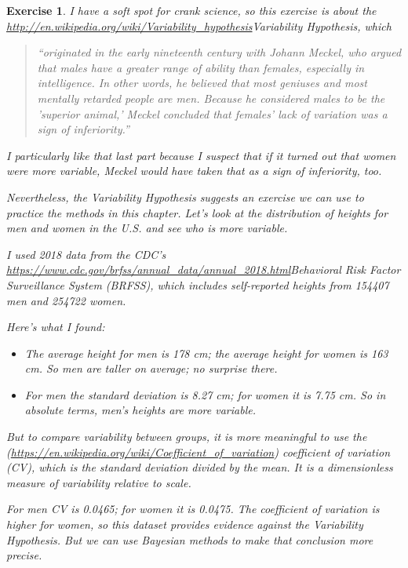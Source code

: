 \documentclass[12pt]{book}
\theoremstyle{exercise}
\newtheorem{exercise}{Exercise}[chapter]
\begin{document}
\begin{exercise}
I have a soft spot for crank science, so this
exercise is about the
\url{http://en.wikipedia.org/wiki/Variability_hypothesis}{Variability
Hypothesis}, which

\begin{quote}
``originated in the early nineteenth century with Johann Meckel, who
argued that males have a greater range of ability than females,
especially in intelligence. In other words, he believed that most
geniuses and most mentally retarded people are men. Because he
considered males to be the 'superior animal,' Meckel concluded that
females' lack of variation was a sign of inferiority.''
\end{quote}

I particularly like that last part because I suspect that if it turned
out that women were \emph{more} variable, Meckel would have taken that
as a sign of inferiority, too.

Nevertheless, the Variability Hypothesis suggests an exercise we can use
to practice the methods in this chapter. Let's look at the distribution
of heights for men and women in the U.S. and see who is more variable.

I used 2018 data from the CDC's
\url{https://www.cdc.gov/brfss/annual_data/annual_2018.html}{Behavioral
Risk Factor Surveillance System} (BRFSS), which includes self-reported
heights from 154407 men and 254722 women.

Here's what I found:

\begin{itemize}
\item
  The average height for men is 178 cm; the average height for women is
  163 cm. So men are taller on average; no surprise there.
\item
  For men the standard deviation is 8.27 cm; for women it is 7.75 cm. So
  in absolute terms, men's heights are more variable.
\end{itemize}

But to compare variability between groups, it is more meaningful to use
the
(\url{https://en.wikipedia.org/wiki/Coefficient_of_variation}) coefficient
of variation (CV), which is the standard deviation divided by the mean.
It is a dimensionless measure of variability relative to scale.

For men CV is 0.0465; for women it is 0.0475. The coefficient of
variation is higher for women, so this dataset provides evidence against
the Variability Hypothesis. But we can use Bayesian methods to make that
conclusion more precise.


\end{exercise}
\end{document}
